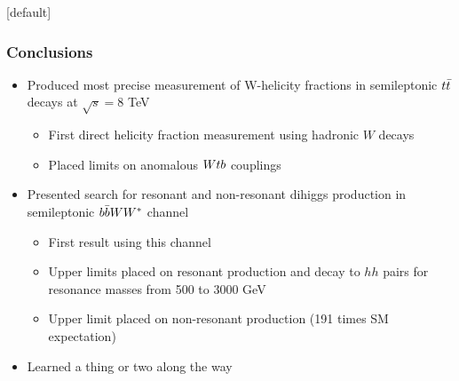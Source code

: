 \documentclass{beamer}
\newcommand*{\ttbar}{\ensuremath{\lowercase{t\bar{t}}}\xspace}
\newcommand*{\Wtb}{\ensuremath{W\lowercase{tb}}\xspace}
\newcommand*{\bbWW}{\ensuremath{\lowercase{b\bar{b}}WW^*}\xspace}
\begin{document}
{ %
  \makeatletter %
  [default] %
  \def\beamer@entrycode{\vspace*{-1.075\headheight}} %
  \makeatother
  \begin{frame}
    \frametitle{Conclusions}
    \begin{itemize}
    \item Produced most precise measurement of W-helicity fractions in semileptonic \ttbar decays at $\sqrt{s}= 8$ TeV
      \begin{itemize}
      \item First direct helicity fraction measurement using hadronic $W$ decays
      \item Placed limits on anomalous \Wtb couplings
      \end{itemize}
    \item Presented search for resonant and non-resonant dihiggs production in semileptonic \bbWW channel
      \begin{itemize}
      \item First result using this channel
      \item Upper limits placed on resonant production and decay to $hh$ pairs for resonance masses from 500 to 3000 GeV
      \item Upper limit placed on non-resonant production (191 times SM expectation)
      \end{itemize}
    \item Learned a thing or two along the way
    \end{itemize}
  \end{frame}
}

\appendix
{}
\setcounter{finalframe}{\value{framenumber}}
\end{document}
